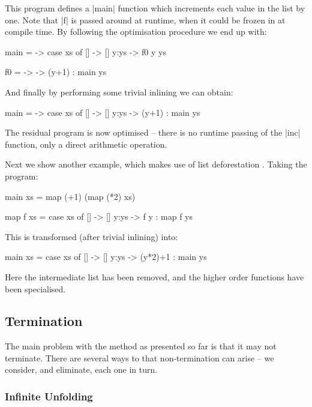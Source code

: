 \documentclass{llncs}
\begin{document}
This program defines a |main| function which increments each value in the list by one. Note that |f| is passed around at runtime, when it could be frozen in at compile time. By following the optimisation procedure we end up with:

\begin{code}
main = \xs -> case  xs of
                    []    -> []
                    y:ys  -> f0 y ys

f0 = \y -> \ys -> (y+1) : main ys
\end{code}

And finally by performing some trivial inlining we can obtain:

\begin{code}
main = \xs -> case  xs of
                    []    -> []
                    y:ys  -> (y+1) : main ys
\end{code}

The residual program is now optimised -- there is no runtime passing of the |inc| function, only a direct arithmetic operation.

Next we show another example, which makes use of list deforestation \cite{wadler:deforestation}. Taking the program:

\begin{code}
main xs = map (+1) (map (*2) xs)

map f xs = case  xs of
                 []    -> []
                 y:ys  -> f y : map f ys
\end{code}

This is transformed (after trivial inlining) into:

\begin{code}
main xs = case  xs of
                []    -> []
                y:ys  -> (y*2)+1 : main ys
\end{code}

Here the intermediate list has been removed, and the higher order functions have been specialised.


\subsection{Termination}
\label{sec:termination}

The main problem with the method as presented so far is that it may not terminate. There are several ways to that non-termination can arise -- we consider, and eliminate, each one in turn.

\subsubsection{Infinite Unfolding}
\end{document}
